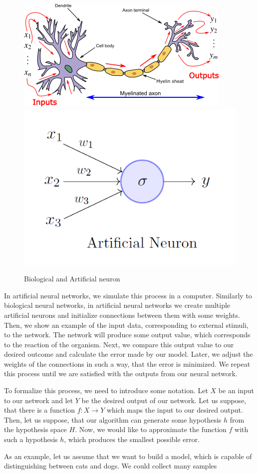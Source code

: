 \begin{figure}
    \centering
    \includegraphics[width=0.5\linewidth]{imgs_andy/biological_neuron.png}
    \includegraphics[width=0.5\linewidth]{imgs_andy/artificial_neuron.png}
    \caption{Biological  and Artificial neuron}
    \label{fig:neurons_comparison}
\end{figure}

In artificial neural networks, we simulate this process in a computer.
Similarly to biological neural networks, in artificial neural networks we create multiple artificial neurons and initialize connections between them with some weights.
Then, we show an example of the input data, corresponding to external stimuli, to the network.
The network will produce some output value, which corresponds to the reaction of the organism.
Next, we compare this output value to our desired outcome and calculate the error made by our model.
Later, we adjust the weights of the connections in such a way, that the error is minimized.
We repeat this process until we are satisfied with the outputs from our neural network.

To formalize this process, we need to introduce some notation.
Let $X$ be an input to our network and let $Y$ be the desired output of our network.
Let us suppose, that there is a function $f: X \to Y$ which maps the input to our desired output.
Then, let us suppose, that our algorithm can generate some hypothesis $h$ from the hypothesis space $H$.
Now, we would like to approximate the function $f$ with such a hypothesis $h$, which produces the smallest possible error.

As an example, let us assume that we want to build a model, which is capable of distinguishing between cats and dogs.
We could collect many samples



